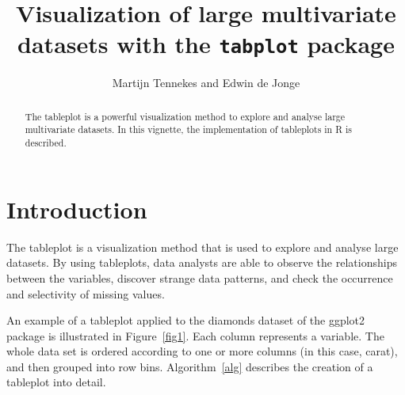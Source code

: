 \documentclass[11pt, fleqn, a4paper]{article}
\title{Visualization of large multivariate datasets with the {\tt tabplot} package}
\author{Martijn Tennekes and Edwin de Jonge}
\begin{document}
\maketitle
\begin{abstract}

The tableplot is a powerful visualization method to explore and analyse large multivariate datasets. In this vignette, the implementation of tableplots in R is described. 


\end{abstract}

\maketitle


\section{Introduction}
The tableplot is a visualization method that is used to explore and analyse large datasets. By using tableplots, data analysts are able to observe the relationships between the variables, discover strange data patterns, and check the occurrence and selectivity of missing values. 

An example of a tableplot applied to the diamonds dataset of the ggplot2 package is illustrated in Figure~\ref{fig1}. Each column represents a variable. The whole data set is ordered according to one or more columns (in this case, carat), and then grouped into row bins. Algorithm~\ref{alg} describes the creation of a tableplot into detail.
\end{document}
